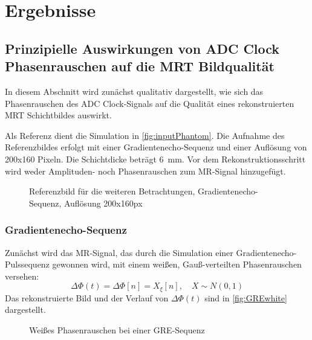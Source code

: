 \chapter{Ergebnisse}

\section{Prinzipielle Auswirkungen von ADC Clock Phasenrauschen auf die MRT Bildqualität}
In diesem Abschnitt wird zunächst qualitativ dargestellt, wie sich das Phasenrauschen des ADC Clock-Signals auf die Qualität eines rekonstruierten MRT Schichtbildes auswirkt.

Als Referenz dient die Simulation in \autoref{fig:inputPhantom}. Die Aufnahme des Referenzbildes erfolgt mit einer Gradientenecho-Sequenz und einer Auflösung von 200x160 Pixeln. Die Schichtdicke beträgt \SI{6}{\mm}. Vor dem Rekonstruktionsschritt wird weder Amplituden- noch Phasenrauschen zum MR-Signal hinzugefügt.

\begin{figure}[H]
	\centering
	\caption[Referenz für die Simulation]{Referenzbild für die weiteren Betrachtungen, Gradientenecho-Sequenz, Auflösung 200x160px}
	\label{fig:inputPhantom}
\end{figure}

\subsection{Gradientenecho-Sequenz}
Zunächst wird das MR-Signal, das durch die Simulation einer Gradientenecho-Pulssequenz gewonnen wird, mit einem weißen, Gauß-verteilten Phasenrauschen versehen:
\begin{equation}
	\label{eq:greWhite}
	\Delta \Phi(t)=\Delta \Phi[n]=X_{\xi}[n], \quad X \sim N(0,1)
\end{equation}
Das rekonstruierte Bild und der Verlauf von $\Delta \Phi(t)$ sind in \autoref{fig:GREwhite} dargestellt.

\begin{figure}[H]
	\centering
	\hfill
	
	\caption{Weißes Phasenrauschen bei einer GRE-Sequenz}
	\label{fig:GREwhite}	
\end{figure}

